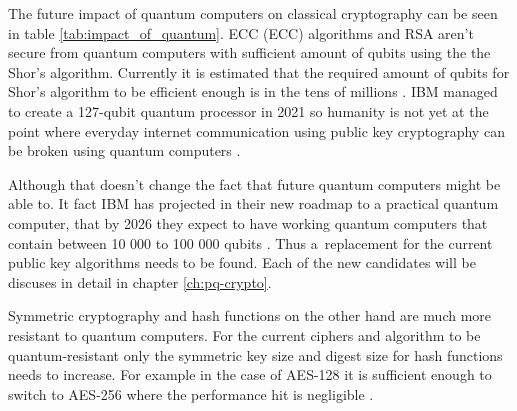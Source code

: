 The future impact of quantum computers on classical cryptography can be seen in table \ref{tab:impact_of_quantum}. ECC (\acl{ECC}) algorithms and RSA aren't secure from quantum computers with sufficient amount of qubits using the the Shor's algorithm. Currently it is estimated that the required amount of qubits for Shor's algorithm to be efficient enough is in the tens of millions \cite{Bernstein149}\cite{Mosca2015}. IBM managed to create a 127-qubit quantum processor in 2021 so humanity is not yet at the point where everyday internet communication using public key cryptography can be broken using quantum computers \cite{0MBNdFRCTLK35MFY}. 

Although that doesn't change the fact that future quantum computers might be able to. It fact IBM has projected in their new roadmap to a practical quantum computer, that by 2026 they expect to have working quantum computers that contain between 10 000 to 100 000 qubits \cite{Gambetta2021}. Thus a~replacement for the current public key algorithms needs to be found. Each of the new candidates will be discuses in detail in chapter \ref{ch:pq-crypto}.

Symmetric cryptography and hash functions on the other hand are much more resistant to quantum computers. For the current ciphers and algorithm to be quantum-resistant only the symmetric key size and digest size for hash functions needs to increase. For example in the case of AES-128 it is sufficient enough to switch to AES-256 where the performance hit is negligible \cite{Bernstein149}.

